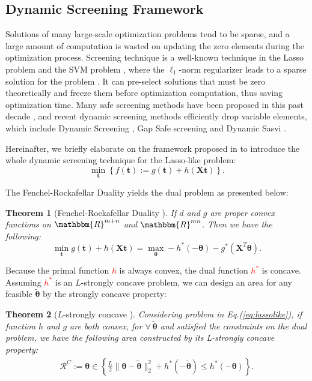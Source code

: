 \documentclass[twoside]{article}
\theoremstyle{plain}
\newtheorem{thm}{Theorem}
\newcommand{\mat}[1]{\mathbf{#1}}
\renewcommand{\vec}[1]{\bm{#1}}
\newcommand{\changeHK}[1]{\textcolor{red}{#1}}
\begin{document}
\subsection{Dynamic Screening Framework}
Solutions of many large-scale optimization problems tend to be sparse, and a large amount of computation is wasted on updating the zero elements during the optimization process. Screening technique is a well-known technique in the Lasso problem and the SVM problem \citep{Ogawa_ICML_2013}, where the $\ell_1$-norm regularizer leads to a sparse solution for the problem \citep{ghaoui2010safe}. It can pre-select solutions that must be zero theoretically and freeze them before optimization computation, thus saving optimization time. Many safe screening methods have been proposed in this past decade \citep{Liu_ICML_2014,Wang_JMLR_2015}, and recent dynamic screening methods efficiently drop variable elements, which include Dynamic Screening \citep{7128732}, Gap Safe screening \citep{JMLR:v18:16-577} and Dynamic Sasvi \citep{NEURIPS2021_7b5b23f4}.

Hereinafter, we briefly elaborate on the framework proposed in \citep{NEURIPS2021_7b5b23f4} to introduce the whole dynamic screening technique for the Lasso-like problem:
\begin{equation}
\label{eq:lassolike}
\min_{\vec{t}} \left\{ f(\vec{t}) := g(\vec{t}) + h(\mat{X} \vec{t}) \right\}.
\end{equation}

The Fenchel-Rockafellar Duality yields the dual problem as presented below:
\begin{thm}[Fenchel-Rockafellar Duality {\citep{Rockafellar_Springer_1998}}] 
\label{Thm:FRD}
If $d$ and $g$ are proper convex functions on $\mathbbm{R}^{m+n}$ and $\mathbbm{R}^{mn}$. Then we have the following:
\begin{equation*}
\min_{\vec{t}} g(\vec{t}) + h(\mat{X}\vec{t}) = \max_{\vec{\vec{\theta}}} -h^*(-\vec{\theta})-g^*(\mat{X}^T\vec{\theta}).
\end{equation*}
\end{thm}

Because the primal function \changeHK{$h$} is always convex, the dual function \changeHK{$h^*$} is concave. Assuming \changeHK{$h^*$} is an $L$-strongly concave problem, we can design an area for any feasible $\tilde{\vec{\theta}}$ by the strongly concave property:

\begin{thm}[$L$-strongly concave {\citep[Theorem 5]{NEURIPS2021_7b5b23f4}}]
\label{thm:circle}
Considering problem in Eq.(\ref{eq:lassolike}), if function $h$ and $g$ are both convex, for $\forall \ \tilde{\vec{\theta}}$ and satisfied the constraints on the dual problem, we have the following area constructed by its L-strongly concave property:  
$$
\begin{aligned}
\mathcal{R}^{C}:=\vec{\theta} \in \left\{\frac{L}{2}\|\vec{\theta}-\tilde{\vec{\theta}}\|_2^2+h^*(-\tilde{\vec{\theta}}) \leq h^*(-\vec{\theta})\right\}.
\end{aligned}
$$
\end{thm}
\end{document}
